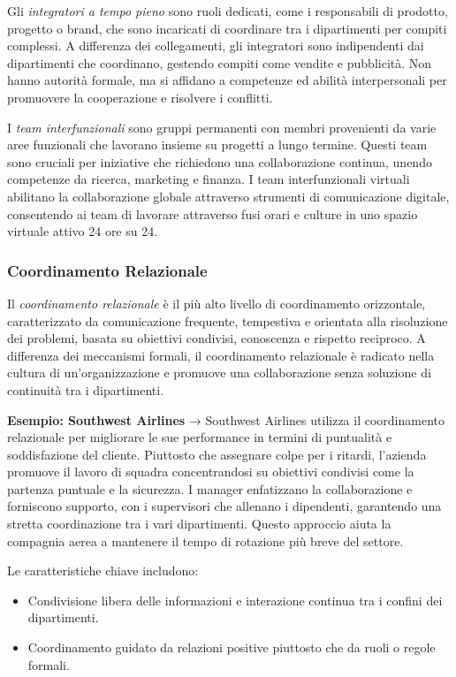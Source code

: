 \documentclass{article}
\begin{document}
Gli \textit{integratori a tempo pieno} sono ruoli dedicati, come i responsabili di prodotto, progetto o brand, che sono incaricati di coordinare tra i dipartimenti per compiti complessi. A differenza dei collegamenti, gli integratori sono indipendenti dai dipartimenti che coordinano, gestendo compiti come vendite e pubblicità. Non hanno autorità formale, ma si affidano a competenze ed abilità interpersonali per promuovere la cooperazione e risolvere i conflitti.


I \textit{team interfunzionali} sono gruppi permanenti con membri provenienti da varie aree funzionali che lavorano insieme su progetti a lungo termine. Questi team sono cruciali per iniziative che richiedono una collaborazione continua, unendo competenze da ricerca, marketing e finanza. I team interfunzionali virtuali abilitano la collaborazione globale attraverso strumenti di comunicazione digitale, consentendo ai team di lavorare attraverso fusi orari e culture in uno spazio virtuale attivo 24 ore su 24.

\subsubsection{Coordinamento Relazionale}
Il \textit{coordinamento relazionale} è il più alto livello di coordinamento orizzontale, caratterizzato da comunicazione frequente, tempestiva e orientata alla risoluzione dei problemi, basata su obiettivi condivisi, conoscenza e rispetto reciproco. A differenza dei meccanismi formali, il coordinamento relazionale è radicato nella cultura di un'organizzazione e promuove una collaborazione senza soluzione di continuità tra i dipartimenti.

\textbf{Esempio: Southwest Airlines} → Southwest Airlines utilizza il coordinamento relazionale per migliorare le sue performance in termini di puntualità e soddisfazione del cliente. Piuttosto che assegnare colpe per i ritardi, l'azienda promuove il lavoro di squadra concentrandosi su obiettivi condivisi come la partenza puntuale e la sicurezza. I manager enfatizzano la collaborazione e forniscono supporto, con i supervisori che allenano i dipendenti, garantendo una stretta coordinazione tra i vari dipartimenti. Questo approccio aiuta la compagnia aerea a mantenere il tempo di rotazione più breve del settore.

Le caratteristiche chiave includono:
\begin{itemize}
    \item Condivisione libera delle informazioni e interazione continua tra i confini dei dipartimenti.
    \item Coordinamento guidato da relazioni positive piuttosto che da ruoli o regole formali.
\end{itemize}
\end{document}
